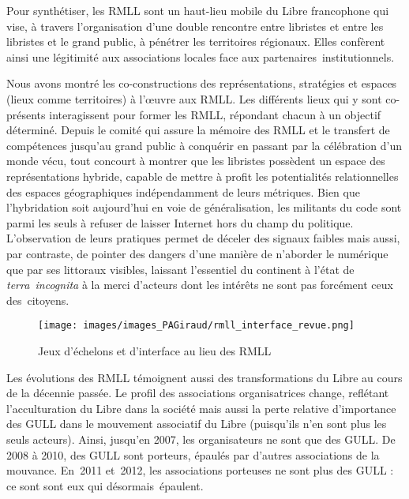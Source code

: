 \documentclass{FramateX}
\begin{document}
\begin{refsection}
Pour synthétiser, les RMLL sont un haut-lieu mobile du Libre francophone
qui vise, à travers l'organisation d'une double rencontre entre
libristes et entre les libristes et le grand public, à pénétrer les
territoires régionaux. Elles confèrent ainsi une légitimité aux
associations locales face aux partenaires~institutionnels.

Nous avons montré les co-constructions des représentations, stratégies
et espaces (lieux comme territoires) à l'œuvre aux RMLL. Les différents
lieux qui y sont co-présents interagissent pour former les RMLL,
répondant chacun à un objectif déterminé. Depuis le comité qui assure
la mémoire des RMLL et le transfert de compétences jusqu'au grand
public à conquérir en passant par la célébration d'un monde vécu, tout
concourt à montrer que les libristes possèdent un espace des
représentations hybride, capable de mettre à profit les potentialités
relationnelles des espaces géographiques indépendamment de leurs
métriques. Bien que l'hybridation soit aujourd'hui en voie de
généralisation, les militants du code sont parmi les seuls à refuser de
laisser Internet hors du champ du politique. L'observation de leurs
pratiques permet de déceler des signaux faibles mais aussi, par
contraste, de pointer des dangers d'une manière de n'aborder le
numérique que par ses littoraux visibles, laissant l'essentiel du
continent à l'état de \textit{terra~incognita} à la merci d'acteurs dont
les intérêts ne sont pas forcément ceux des~citoyens.

\begin{figure}
\centering
\texttt{[image: images/images\_PAGiraud/rmll\_interface\_revue.png]} 
\caption{Jeux d'échelons et d'interface au lieu des RMLL}
\end{figure}

Les évolutions des RMLL témoignent aussi des transformations du Libre au
cours de la décennie passée. Le profil des associations organisatrices
change, reflétant l'acculturation du Libre dans la société mais aussi
la perte relative d'importance des GULL dans le mouvement associatif du
Libre (puisqu'ils n'en sont plus les seuls acteurs). Ainsi,
jusqu'en 2007, les organisateurs ne sont que des GULL. De 2008 à 2010,
des GULL sont porteurs, épaulés par d'autres associations de la
mouvance. En~2011 et~2012, les associations porteuses ne sont plus des
GULL : ce sont sont eux qui désormais~épaulent.


\end{refsection}
\end{document}
